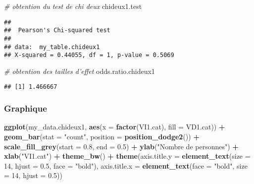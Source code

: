 \documentclass[
]{book}
\newenvironment{Shaded}{\begin{snugshade}}{\end{snugshade}}
\newcommand{\CommentTok}[1]{\textcolor[rgb]{0.56,0.35,0.01}{\textit{#1}}}
\newcommand{\DataTypeTok}[1]{\textcolor[rgb]{0.13,0.29,0.53}{#1}}
\newcommand{\DecValTok}[1]{\textcolor[rgb]{0.00,0.00,0.81}{#1}}
\newcommand{\FloatTok}[1]{\textcolor[rgb]{0.00,0.00,0.81}{#1}}
\newcommand{\KeywordTok}[1]{\textcolor[rgb]{0.13,0.29,0.53}{\textbf{#1}}}
\newcommand{\NormalTok}[1]{#1}
\newcommand{\OperatorTok}[1]{\textcolor[rgb]{0.81,0.36,0.00}{\textbf{#1}}}
\newcommand{\StringTok}[1]{\textcolor[rgb]{0.31,0.60,0.02}{#1}}
\begin{document}
\begin{Shaded}
\begin{Highlighting}[]
\CommentTok{# obtention du test de chi deux }
\NormalTok{chideux1.test}
\end{Highlighting}
\end{Shaded}

\begin{verbatim}
## 
## 	Pearson's Chi-squared test
## 
## data:  my_table.chideux1
## X-squared = 0.44055, df = 1, p-value = 0.5069
\end{verbatim}

\begin{Shaded}
\begin{Highlighting}[]
\CommentTok{# obtention des tailles d'effet}
\NormalTok{odds.ratio.chideux1}
\end{Highlighting}
\end{Shaded}

\begin{verbatim}
## [1] 1.466667
\end{verbatim}

\hypertarget{graphique-7}{%
\subsubsection{Graphique}\label{graphique-7}}

\begin{Shaded}
\begin{Highlighting}[]
\KeywordTok{ggplot}\NormalTok{(my_data.chideux1, }\KeywordTok{aes}\NormalTok{(}\DataTypeTok{x =} \KeywordTok{factor}\NormalTok{(VI1.cat), }\DataTypeTok{fill =}\NormalTok{ VD1.cat)) }\OperatorTok{+}\StringTok{ }
\StringTok{  }\KeywordTok{geom_bar}\NormalTok{(}\DataTypeTok{stat =} \StringTok{"count"}\NormalTok{, }\DataTypeTok{position =} \KeywordTok{position_dodge2}\NormalTok{())  }\OperatorTok{+}
\StringTok{  }\KeywordTok{scale_fill_grey}\NormalTok{(}\DataTypeTok{start =} \FloatTok{0.8}\NormalTok{, }\DataTypeTok{end =} \FloatTok{0.5}\NormalTok{) }\OperatorTok{+}
\StringTok{  }\KeywordTok{ylab}\NormalTok{(}\StringTok{"Nombre de personnes"}\NormalTok{) }\OperatorTok{+}\StringTok{ }\KeywordTok{xlab}\NormalTok{(}\StringTok{"VI1.cat"}\NormalTok{) }\OperatorTok{+}\StringTok{ }
\StringTok{  }\KeywordTok{theme_bw}\NormalTok{() }\OperatorTok{+}\StringTok{ }
\StringTok{  }\KeywordTok{theme}\NormalTok{(}\DataTypeTok{axis.title.y =} \KeywordTok{element_text}\NormalTok{(}\DataTypeTok{size =} \DecValTok{14}\NormalTok{, }\DataTypeTok{hjust =} \FloatTok{0.5}\NormalTok{, }\DataTypeTok{face =} \StringTok{"bold"}\NormalTok{), }
        \DataTypeTok{axis.title.x =} \KeywordTok{element_text}\NormalTok{(}\DataTypeTok{face =} \StringTok{"bold"}\NormalTok{, }\DataTypeTok{size =} \DecValTok{14}\NormalTok{, }\DataTypeTok{hjust =} \FloatTok{0.5}\NormalTok{))}
\end{Highlighting}
\end{Shaded}
\end{document}
